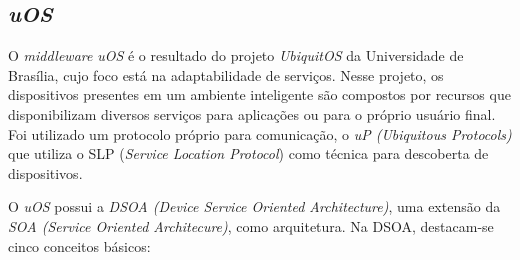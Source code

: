 \subsection{\emph{uOS}}
\label{subsec:introUos}

O \emph{middleware} \emph{uOS} é o resultado do projeto \emph{UbiquitOS} da Universidade de Brasília, cujo foco está na adaptabilidade de serviços. Nesse projeto, os dispositivos presentes em um ambiente inteligente são compostos por recursos que disponibilizam diversos serviços para aplicações ou para o próprio usuário final. Foi utilizado um protocolo próprio para comunicação, o \emph{uP (Ubiquitous Protocols)} que utiliza o SLP (\emph{Service Location Protocol}) como técnica para descoberta de dispositivos. 

O \emph{uOS} possui a \emph{DSOA (Device Service Oriented Architecture)}, uma extensão da \emph{SOA (Service Oriented Architecure)}, como arquitetura. Na DSOA, destacam-se cinco conceitos básicos:

